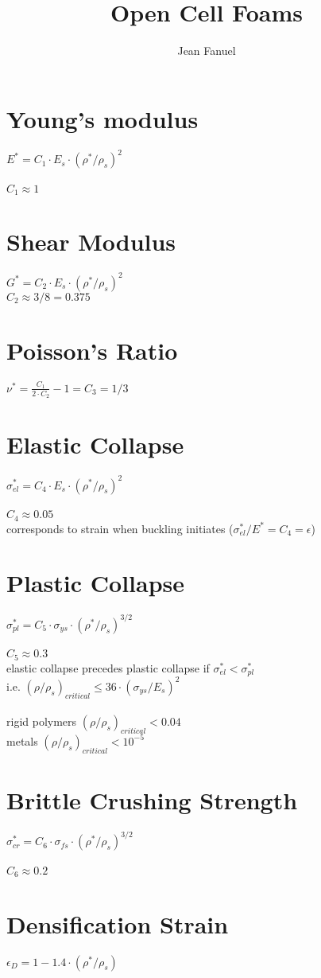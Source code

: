 \documentclass[12pt]{article}
\title{Open Cell Foams}
\author{Jean Fanuel}
\begin{document}
\setlength{\parindent}{1cm}
\maketitle
\section{Young's modulus}
$E^* = C_1 \cdot E_s \cdot (\rho^* / \rho_s)^2$\\
\\
$C_1 \approx 1$\\
\section{Shear Modulus}
$G^* = C_2 \cdot E_s \cdot (\rho^* / \rho_s)^2$
\\
$C_2 \approx 3/8 = 0.375$\\

\section{Poisson's Ratio}
$\nu^* = \frac{C_1}{2 \cdot C_2} - 1 = C_3 = 1/3 $\\

\section{Elastic Collapse}

$\sigma^*_{el} = C_4 \cdot E_s \cdot (\rho^* / \rho_s)^2$\\
\\
$C_4 \approx 0.05 $\\
corresponds to strain when buckling initiates ($\sigma^*_{el} / E^* = C_4 = \epsilon$)\\

\section{Plastic Collapse}
$\sigma^*_{pl} = C_5 \cdot \sigma_{ys} \cdot (\rho^* / \rho_s)^{3/2}$\\
\\
$C_5 \approx 0.3$\\
elastic collapse precedes plastic collapse if $\sigma^*_{el} < \sigma^*_{pl}$\\
i.e. $(\rho / \rho_s)_{critical} \le 36 \cdot (\sigma_{ys} / E_s)^2$\\
\\
rigid polymers $(\rho / \rho_s)_{critical} < 0.04 $\\
metals $(\rho / \rho_s)_{critical} < 10^{-5} $\\

\section{Brittle Crushing Strength}

$\sigma^*_{cr} = C_6 \cdot \sigma_{fs} \cdot (\rho^* / \rho_s)^{3/2}$\\
\\
$C_6 \approx 0.2$\\

\section{Densification Strain}
$\epsilon_D = 1 - 1.4 \cdot (\rho^* / \rho_s)$
\end{document}
